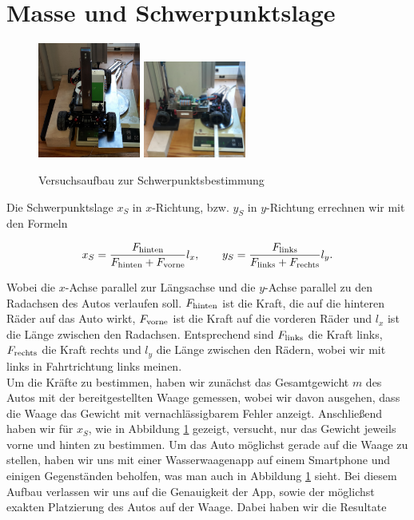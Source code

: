 \section{Masse und Schwerpunktslage}

\newcommand{\hi}{{\textnormal{hinten}}}
\newcommand{\vo}{{\textnormal{vorne}}}
\newcommand{\li}{{\textnormal{links}}}
\newcommand{\re}{{\textnormal{rechts}}}
\newcommand{\gr}{{\textnormal{ g}}}
\newcommand{\m}{{\textnormal{ m}}}
\newcommand{\Abb}{\textbf{ABBILDUNG }}

\begin{figure}[h]
\centering
\includegraphics[width=0.3\textwidth]{Figures/Schwerpunktmessung_links_rechts.jpg}
\includegraphics[width=0.3\textwidth]{Figures/Schwerpunktmessung_vorne_hinten.jpg}
\caption{Versuchsaufbau zur Schwerpunktsbestimmung}


\label{fig:Schwerpunkt}
\end{figure}
Die Schwerpunktslage $x_S$ in $x$-Richtung, bzw. $y_S$ in $y$-Richtung errechnen wir mit den Formeln 

$$x_S = \frac{F_\hi}{F_\hi + F_\vo} l_x, \qquad y_S = \frac{F_\li}{F_\li + F_\re} l_y.$$

Wobei die $x$-Achse parallel zur Längsachse und die $y$-Achse parallel zu den Radachsen des Autos verlaufen soll. $F_\hi$ ist die Kraft, die auf die hinteren Räder auf das Auto wirkt, $F_\vo$ ist die Kraft auf die vorderen Räder und $l_x$ ist die Länge zwischen den Radachsen. Entsprechend sind $F_\li$ die Kraft links, $F_\re$ die Kraft rechts und $l_y$ die Länge zwischen den Rädern, wobei wir mit links in Fahrtrichtung links meinen. \\
Um die Kräfte zu bestimmen, haben wir zunächst das Gesamtgewicht $m$ des Autos mit der bereitgestellten Waage gemessen, wobei wir davon ausgehen, dass die Waage das Gewicht mit vernachlässigbarem Fehler anzeigt. Anschließend haben wir für $x_S$, wie in Abbildung \ref{fig:Schwerpunkt} gezeigt, versucht, nur das Gewicht jeweils vorne und hinten zu bestimmen. Um das Auto möglichst gerade auf die Waage zu stellen, haben wir uns mit einer Wasserwaagenapp auf einem Smartphone und einigen Gegenständen beholfen, was man auch in Abbildung \ref{fig:Schwerpunkt} sieht. Bei diesem Aufbau verlassen wir uns auf die Genauigkeit der App, sowie der möglichst exakten Platzierung des Autos auf der Waage.  
Dabei haben wir die Resultate 

